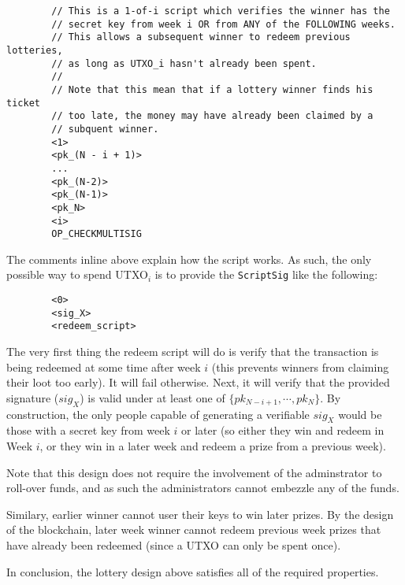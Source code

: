 \documentclass[12pt]{exam}
\begin{document}
\begin{questions}
\begin{solution}
\begin{enumerate}[label=\textbf{\alph*}.]
\begin{verbatim}
        // This is a 1-of-i script which verifies the winner has the
        // secret key from week i OR from ANY of the FOLLOWING weeks.
        // This allows a subsequent winner to redeem previous lotteries,
        // as long as UTXO_i hasn't already been spent.
        //
        // Note that this mean that if a lottery winner finds his ticket
        // too late, the money may have already been claimed by a
        // subquent winner.
        <1>
        <pk_(N - i + 1)>
        ...
        <pk_(N-2)>
        <pk_(N-1)>
        <pk_N>
        <i>
        OP_CHECKMULTISIG
      \end{verbatim}
      The comments inline above explain how the script works. As such, the only possible way to spend UTXO$_i$ is to provide the \texttt{ScriptSig} like the following:
      \begin{verbatim}
        <0>
        <sig_X>
        <redeem_script>
      \end{verbatim}
      The very first thing the redeem script will do is verify that the transaction is being redeemed at some time after week $i$ (this prevents winners from claiming their loot too early). It will fail otherwise. Next, it will verify that the provided signature ($sig_X$) is valid under at least one of $\{pk_{N-i+1}, \cdots, pk_{N}\}$. By construction, the only people capable of generating a verifiable $sig_X$ would be those with a secret key from week $i$ or later (so either they win and redeem in Week $i$, or they win in a later week and redeem a prize from a previous week).

      Note that this design does not require the involvement of the adminstrator to roll-over funds, and as such the administrators cannot embezzle any of the funds.

      Similary, earlier winner cannot user their keys to win later prizes. By the design of the blockchain, later week winner cannot redeem previous week prizes that have already been redeemed (since a UTXO can only be spent once).

      In conclusion, the lottery design above satisfies all of the required properties.
  \end{enumerate}
\end{solution}



\end{questions}
\end{document}
